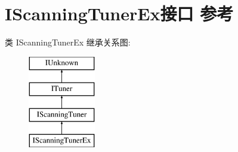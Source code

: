 \hypertarget{interface_i_scanning_tuner_ex}{}\section{I\+Scanning\+Tuner\+Ex接口 参考}
\label{interface_i_scanning_tuner_ex}
类 I\+Scanning\+Tuner\+Ex 继承关系图\+:\begin{figure}[H]
\begin{center}
\leavevmode
\includegraphics[height=4.000000cm]{interface_i_scanning_tuner_ex}
\end{center}
\end{figure}
